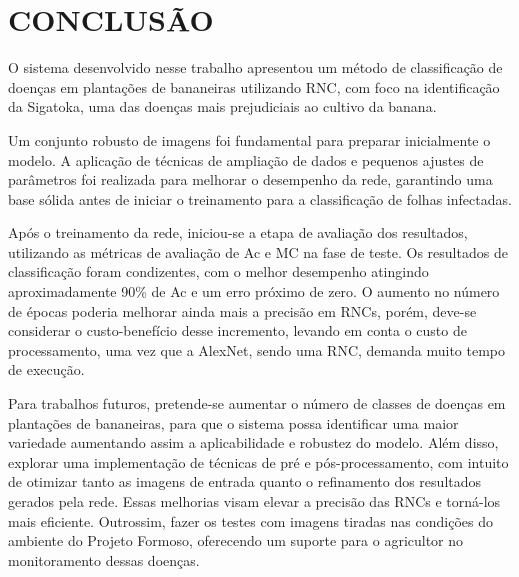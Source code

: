 \chapter{CONCLUSÃO}{}
\label{cap:06}
O sistema desenvolvido nesse trabalho apresentou um método de classificação de doenças em plantações de bananeiras utilizando \ac{RNC}, com foco na identificação da Sigatoka, uma das doenças mais prejudiciais ao cultivo da banana.

Um conjunto robusto de imagens foi fundamental para preparar inicialmente o modelo. A aplicação de técnicas de ampliação de dados e pequenos ajustes de parâmetros foi realizada para melhorar o desempenho da rede, garantindo uma base sólida antes de iniciar o treinamento para a classificação de folhas infectadas.

Após o treinamento da rede, iniciou-se a etapa de avaliação dos resultados, utilizando as métricas de avaliação de \ac{Ac} e \ac{MC} na fase de teste. Os resultados de classificação foram condizentes, com o melhor desempenho atingindo aproximadamente 90\% de \ac{Ac} e um erro próximo de zero. O aumento no número de épocas poderia melhorar ainda mais a precisão em \ac{RNC}s, porém, deve-se considerar o custo-benefício desse incremento, levando em conta o custo de processamento, uma vez que a AlexNet, sendo uma \ac{RNC}, demanda muito tempo de execução.



Para trabalhos futuros, pretende-se aumentar o número de classes de doenças em plantações de bananeiras, para que o sistema possa identificar uma maior variedade aumentando assim a aplicabilidade e robustez do modelo. Além disso, explorar uma implementação de técnicas de pré e pós-processamento, com intuito de otimizar tanto as imagens de entrada quanto o refinamento dos resultados gerados pela rede. Essas melhorias visam elevar a precisão das \ac{RNC}s e torná-los mais eficiente. Outrossim, fazer os testes com imagens tiradas nas condições do ambiente do Projeto Formoso, oferecendo um suporte para o agricultor no monitoramento dessas doenças.

